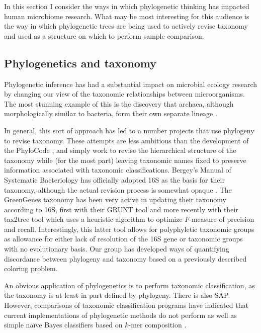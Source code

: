 \documentclass{amsart}
\begin{document}
In this section I consider the ways in which phylogenetic thinking has impacted human microbiome research.
What may be most interesting for this audience is the way in which phylogenetic trees are being used to actively revise taxonomy and used as a structure on which to perform sample comparison.

\subsection{Phylogenetics and taxonomy}

Phylogenetic inference has had a substantial impact on microbial ecology research by changing our view of the taxonomic relationships between microorganisms.
The most stunning example of this is the discovery that archaea, although morphologically similar to bacteria, form their own separate lineage \citep{woese1977phylogenetic}.

In general, this sort of approach has led to a number projects that use phylogeny to revise taxonomy.
These attempts are less ambitious than the development of the PhyloCode \citep{forey2001phylocode}, and simply work to revise the hierarchical structure of the taxonomy while (for the most part) leaving taxonomic names fixed to preserve information associated with taxonomic classifications.
Bergey's Manual of Systematic Bacteriology has officially adopted 16S as the basis for their taxonomy, although the actual revision process is somewhat opaque \citep{kreig1984bergey}.
The GreenGenes taxonomy \citep{desantis2006greengenes} has been very active in updating their taxonomy according to 16S, first with their GRUNT tool \citep{dalevi2007automated} and more recently with their tax2tree tool \citep{mcdonald2011improved} which uses a heuristic algorithm to optimize $F$-measure of precision and recall.
Interestingly, this latter tool allows for polyphyletic taxonomic groups as allowance for either lack of resolution of the 16S gene or taxonomic groups with no evolutionary basis.
Our group \citep{matsen2011reconciling} has developed ways of quantifying discordance between phylogeny and taxonomy based on a previously described coloring problem.

An obvious application of phylogenetics is to perform taxonomic classification, as the taxonomy is at least in part defined by phylogeny.
There is also SAP.
However, comparisons of taxonomic classification programs \citep{liu2008accurate,bazinet2012comparative} have indicated that current implementations of phylogenetic methods do not perform as well as simple na\"ive Bayes classifiers based on $k$-mer composition \citep{wang2007naive,rosen2008metagenome}.
\end{document}
